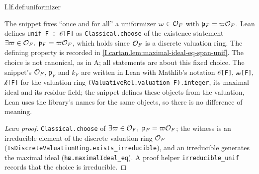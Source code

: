 \begin{definition}[uniformizer]
\end{definition}
\begin{tfformal}{I.lf.def:uniformizer}
\begin{tffidelity}
The snippet fixes ``once and for all'' a uniformizer $\varpi\in\mathcal{O}_F$ with $\mathfrak p_F=\varpi\mathcal{O}_F$. Lean defines \texttt{unif F : 𝒪[F]} as \texttt{Classical.choose} of the existence statement $\exists\varpi\in\Ocal_F,\ \mathfrak p_F=\varpi\Ocal_F$, which holds since $\mathcal{O}_F$ is a discrete valuation ring. The defining property is recorded in \cref{I.cartan.lem:maximal-ideal-eq-span-unif}. The choice is not canonical, as in A; all statements are about this fixed choice. The snippet's $\mathcal{O}_F$, $\mathfrak p_F$ and $k_F$ are written in Lean with Mathlib's notation \texttt{𝒪[F]}, \texttt{𝓂[F]}, \texttt{𝓀[F]} for the valuation ring \texttt{(ValuativeRel.valuation F).integer}, its maximal ideal and its residue field; the snippet defines these objects from the valuation, Lean uses the library's names for the same objects, so there is no difference of meaning.
\end{tffidelity}
\end{tfformal}
\begin{proof}[Lean proof]
\texttt{Classical.choose} of $\exists\varpi\in\Ocal_F,\ \mathfrak p_F=\varpi\Ocal_F$; the witness is an irreducible element of the discrete valuation ring $\mathcal{O}_F$ (\texttt{IsDiscreteValuationRing.exists\_irreducible}), and an irreducible generates the maximal ideal (\texttt{hϖ.maximalIdeal\_eq}). A proof helper \texttt{irreducible\_unif} records that the choice is irreducible.
\end{proof}

